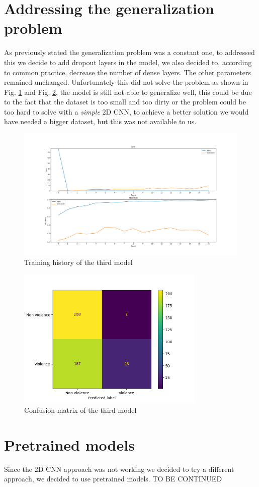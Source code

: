 \section{Addressing the generalization problem}
As previously stated the generalization problem was a constant one, to addressed this we decide to add dropout layers in the model, we also decided to, according to common practice, decrease the number of dense layers. The other parameters remained unchanged. Unfortunately this did not solve the problem as shown in Fig. \ref{fig:Third2DCNNHistory} and Fig. \ref{fig:Third2DCNNMatrix}, the model is still not able to generalize well, this could be due to the fact that the dataset is too small and too dirty or the problem could be too hard to solve with a \textit{simple} 2D CNN, to achieve a better solution we would have needed a bigger dataset, but this was not available to us.
\begin{figure}[]
    \centering
    \includegraphics[width=1\textwidth]{images/731a-2DFabioFinal-86ad-history.png}
    \caption{Training history of the third model}
    \label{fig:Third2DCNNHistory}
\end{figure}
\begin{figure}[]
    \centering
    \includegraphics[width=0.8\textwidth]{images/731a-2DFabioFinal-86ad-conf_matrix.png}
    \caption{Confusion matrix of the third model}
    \label{fig:Third2DCNNMatrix}
\end{figure}

\section{Pretrained models}
Since the 2D CNN approach was not working we decided to try a different approach, we decided to use pretrained models.
TO BE CONTINUED

